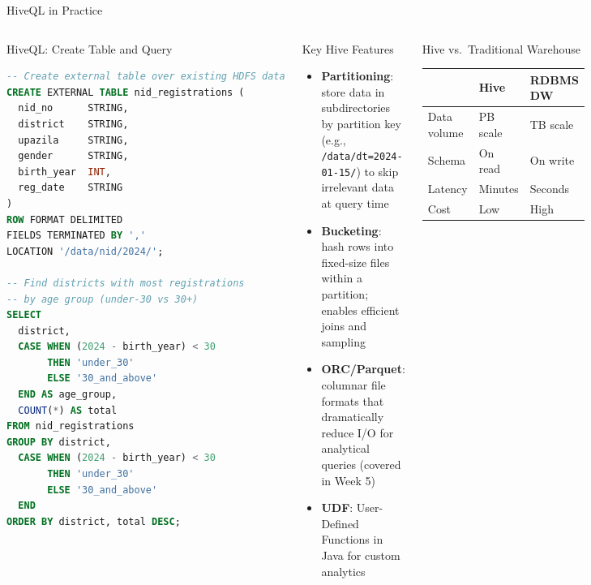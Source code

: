 \documentclass[aspectratio=169,10pt]{beamer}
\begin{document}
\begin{frame}[fragile]{HiveQL in Practice}
  \begin{columns}[T]
      \begin{exampleblock}{HiveQL: Create Table and Query}
        \begin{lstlisting}[language=SQL,
            title={Analyzing NID registration data (hypothetical)}]
-- Create external table over existing HDFS data
CREATE EXTERNAL TABLE nid_registrations (
  nid_no      STRING,
  district    STRING,
  upazila     STRING,
  gender      STRING,
  birth_year  INT,
  reg_date    STRING
)
ROW FORMAT DELIMITED
FIELDS TERMINATED BY ','
LOCATION '/data/nid/2024/';

-- Find districts with most registrations
-- by age group (under-30 vs 30+)
SELECT
  district,
  CASE WHEN (2024 - birth_year) < 30
       THEN 'under_30'
       ELSE '30_and_above'
  END AS age_group,
  COUNT(*) AS total
FROM nid_registrations
GROUP BY district,
  CASE WHEN (2024 - birth_year) < 30
       THEN 'under_30'
       ELSE '30_and_above'
  END
ORDER BY district, total DESC;
        \end{lstlisting}
      \end{exampleblock}

      \begin{block}{Key Hive Features}
        \begin{itemize}
          \item \textbf{Partitioning}: store data in subdirectories by partition key (e.g., \texttt{/data/dt=2024-01-15/}) to skip irrelevant data at query time
          \item \textbf{Bucketing}: hash rows into fixed-size files within a partition; enables efficient joins and sampling
          \item \textbf{ORC/Parquet}: columnar file formats that dramatically reduce I/O for analytical queries (covered in Week 5)
          \item \textbf{UDF}: User-Defined Functions in Java for custom analytics
        \end{itemize}
      \end{block}
      \vspace{4pt}
      \begin{alertblock}{Hive vs.\ Traditional Warehouse}
        \renewcommand{\arraystretch}{1.15}
        \begin{tabular}{lll}
          \toprule
          & \textbf{Hive} & \textbf{RDBMS DW} \\
          \midrule
          Data volume & PB scale & TB scale \\
          Schema      & On read  & On write \\
          Latency     & Minutes  & Seconds  \\
          Cost        & Low      & High     \\
          \bottomrule
        \end{tabular}
      \end{alertblock}
  \end{columns}
\end{frame}
\end{document}

